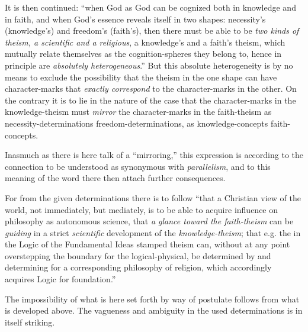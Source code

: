 \documentclass[12pt,a4paper]{book}
\begin{document}
It is then continued: ``when God as God can be cognized both in knowledge and in faith, and when God's essence
reveals itself in two shapes: necessity's (knowledge's) and freedom's (faith's), then there must be able to be
\emph{two kinds of theism, a scientific and a religious}, a knowledge's and a faith's theism, which mutually
relate themselves as the cognition-spheres they belong to, hence in principle are \emph{absolutely
heterogeneous}.'' But this absolute heterogeneity is by no means to exclude the possibility that the theism in the
one shape can have character-marks that \emph{exactly correspond} to the character-marks in the other. On the contrary it
is to lie in the nature of the case that the character-marks in the knowledge-theism must \emph{mirror} the
character-marks in the faith-theism as necessity-determinations freedom-determinations, as knowledge-concepts
faith-concepts.

Inasmuch as there is here talk of a ``mirroring,'' this expression is according to the connection to be understood
as synonymous with \emph{parallelism}, and to this meaning of the word there then attach further consequences.

For from the given determinations there is to follow ``that a Christian view of the world, not immediately, but
mediately, is to be able to acquire influence on philosophy as autonomous science, that \emph{a glance toward the
faith-theism} can be \emph{guiding} in a strict \emph{scientific} development of the \emph{knowledge-theism}; that e.g. the
in the Logic of the Fundamental Ideas stamped theism can, without at any point overstepping the boundary for the
logical-physical, be determined by and determining for a corresponding philosophy of religion, which accordingly
acquires Logic for foundation.''

The impossibility of what is here set forth by way of postulate follows from what is developed above. The vagueness
and ambiguity in the used determinations is in itself striking.
\end{document}
